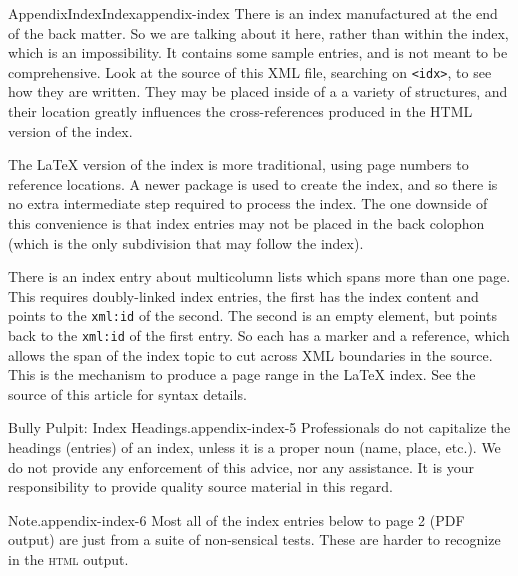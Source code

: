 \documentclass[twoside,10pt,]{article}
\newcommand{\mono}[1]{\texttt{#1}}
\newcommand{\initialism}[1]{\textsc{\MakeLowercase{#1}}}
\numberwithin{equation}{section}
\begin{document}
%
%
\typeout{************************************************}
\typeout{************************************************}
%
\begin{appendixptx}{Appendix}{Index}{}{Index}{}{}{appendix-index}
\renewcommand*{\appendixname}{Appendix}
There is an index manufactured at the end of the back matter.  So we are talking about it here, rather than within the index, which is an impossibility.  It contains some sample entries, and is not meant to be comprehensive.  Look at the source of this XML file, searching on \mono{<idx>}, to see how they are written.  They may be placed inside of a a variety of structures, and their location greatly influences the cross-references produced in the HTML version of the index.%
\par
The \LaTeX{} version of the index is more traditional, using page numbers to reference locations.  A newer package is used to create the index, and so there is no extra intermediate step required to process the index.  The one downside of this convenience is that index entries may not be placed in the back colophon (which is the only subdivision that may follow the index).%
\par
There is an index entry about multicolumn lists which spans more than one page.  This requires doubly-linked index entries, the first has the index content and points to the \mono{xml:id} of the second.  The second is an empty element, but points back to the \mono{xml:id} of the first entry.  So each has a marker and a reference, which allows the span of the index topic to cut across XML boundaries in the source.  This is the mechanism to produce a page range in the \LaTeX{} index.  See the source of this article for syntax details.%
\begin{paragraphs}{Bully Pulpit: Index Headings.}{appendix-index-5}%
Professionals do not capitalize the headings (entries) of an index, unless it is a proper noun (name, place, etc.\@).  We do not provide any enforcement of this advice, nor any assistance.  It is your responsibility to provide quality source material in this regard.%
\end{paragraphs}%
\begin{paragraphs}{Note.}{appendix-index-6}%
Most all of the index entries below to page 2 (PDF output) are just from a suite of non-sensical tests.  These are harder to recognize in the \initialism{HTML} output.%
\end{paragraphs}%
\end{appendixptx}
%
%
\typeout{************************************************}
\end{document}
